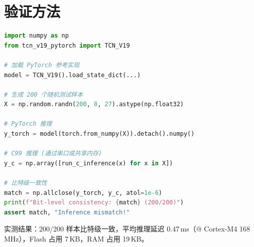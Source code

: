 
\section{验证方法}

\begin{lstlisting}[language=Python, caption={NumPy 比特级验证}]
import numpy as np
from tcn_v19_pytorch import TCN_V19

# 加载 PyTorch 参考实现
model = TCN_V19().load_state_dict(...)

# 生成 200 个随机测试样本
X = np.random.randn(200, 8, 27).astype(np.float32)

# PyTorch 推理
y_torch = model(torch.from_numpy(X)).detach().numpy()

# C99 推理 (通过串口或共享内存)
y_c = np.array([run_c_inference(x) for x in X])

# 比特级一致性
match = np.allclose(y_torch, y_c, atol=1e-6)
print(f"Bit-level consistency: {match} (200/200)")
assert match, "Inference mismatch!"
\end{lstlisting}

\par 实测结果：200/200 样本比特级一致，平均推理延迟 0.47\,ms（@ Cortex-M4
168\,MHz），Flash 占用 7\,KB，RAM 占用 19\,KB。
